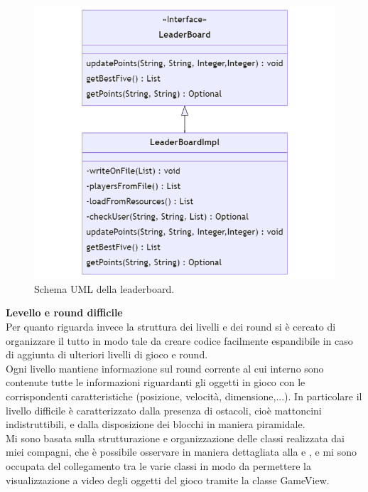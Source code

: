 \documentclass[a4paper,12pt]{report}
\begin{document}
\begin{figure}[H]
    \centering{}
    \includegraphics[scale=0.6]{images/leaderboard.png}
    \caption{Schema UML della leaderboard.}
    \label{images:leaderboard}
\end{figure}
\pagebreak
\textbf{Levello e round difficile}\\
Per quanto riguarda invece la struttura dei livelli e dei round si è cercato di organizzare il tutto in modo tale da creare codice facilmente espandibile in caso di aggiunta di ulteriori livelli di gioco e round.
\\Ogni livello mantiene informazione sul round corrente al cui interno sono contenute tutte le informazioni riguardanti gli oggetti in gioco con le corrispondenti caratteristiche (posizione, velocità, dimensione,...).
In particolare il livello difficile è caratterizzato dalla presenza di ostacoli, cioè mattoncini indistruttibili, e dalla disposizione dei blocchi in maniera piramidale.
\\Mi sono basata sulla strutturazione e organizzazione delle classi realizzata dai miei compagni, che è possibile osservare in maniera dettagliata alla  e , e mi sono occupata del collegamento tra le varie classi in modo da permettere la visualizzazione a video degli oggetti del gioco tramite la classe GameView.\\\\
\end{document}
